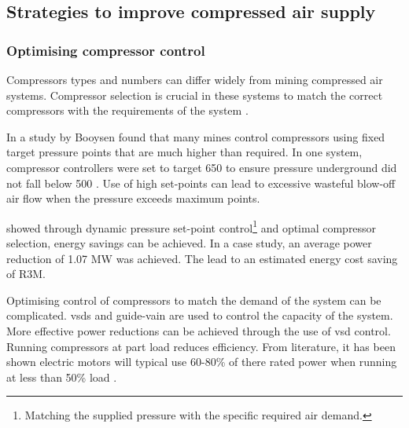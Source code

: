 	\subsection{Strategies to improve compressed air supply}

		\subsubsection{Optimising compressor control}
		Compressors types and numbers can differ widely from mining compressed air systems. Compressor selection is crucial in these systems to match the correct compressors with the requirements of the system \cite{marais2010expert}.
		\par 
		In a study by Booysen \cite{Booysen2012Masters} found that many mines control compressors using fixed target pressure points that are much higher than required. In one system, compressor controllers were set to target 650  to ensure pressure underground did not fall below 500 . Use of high set-points can lead to excessive wasteful blow-off air flow when the pressure exceeds maximum points.
		\par
		 \cite{booysen2009optimising} showed through dynamic pressure set-point control\footnote{Matching the supplied pressure with the specific required air demand.} and optimal compressor selection, energy savings can be achieved. In a case study, an average power reduction of 1.07 MW was achieved. The lead to an estimated energy cost saving of R3M.
		\par 
	 	Optimising control of compressors to match the demand of the system can be complicated. \glspl{vsd} and guide-vain are used to control the capacity of the system. More effective power reductions can be achieved through the use of \gls{vsd} control. Running compressors at part load reduces efficiency. From literature, it has been shown electric motors will typical use 60-80\% of there rated power when running at less than 50\% load \cite{Saidur2010}.
		
		
